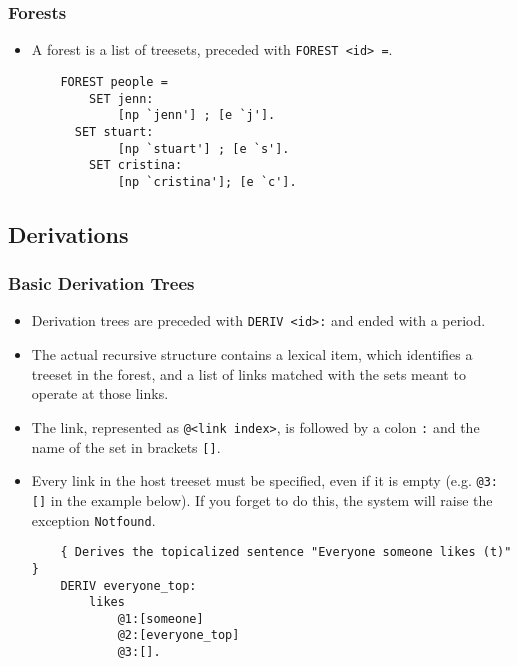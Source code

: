 \documentclass[10.5pt]{article}
\newcommand{\code}[1]{\texttt{#1}}
\begin{document}
\subsubsection{Forests}
  \begin{itemize}
	\item A forest is a list of treesets, preceded with \code{FOREST <id> =}.

    \begin{mdframed}[backgroundcolor=blue!5]
    \begin{verbatim}
	FOREST people =
	    SET jenn:
	        [np `jenn'] ; [e `j'].
      SET stuart:
	        [np `stuart'] ; [e `s'].
	    SET cristina:
	        [np `cristina']; [e `c'].
	\end{verbatim}
	\end{mdframed}
  \end{itemize}

\subsection{Derivations}

\subsubsection{Basic Derivation Trees}
  \begin{itemize}
	\item Derivation trees are preceded with \code{DERIV <id>:} and ended with a period.
	\item The actual recursive structure contains a lexical item, which identifies a treeset in the forest, and a list of links matched with the sets meant to operate at those links.
	\item The link, represented as \code{@<link index>}, is followed by a colon \code{:} and the name of the set in brackets \code{[]}.
	\item Every link in the host treeset must be specified, even if it is empty (e.g. \code{@3:[]} in the example below). If you forget to do this, the system will raise the exception \code{Not\textunderscore found}.

	\begin{mdframed}[backgroundcolor=blue!5]
	\begin{verbatim}
	{ Derives the topicalized sentence "Everyone someone likes (t)" }
	DERIV everyone_top:
	    likes
	        @1:[someone]
	        @2:[everyone_top]
	        @3:[].
	\end{verbatim}
	\end{mdframed}
  \end{itemize}
\end{document}
